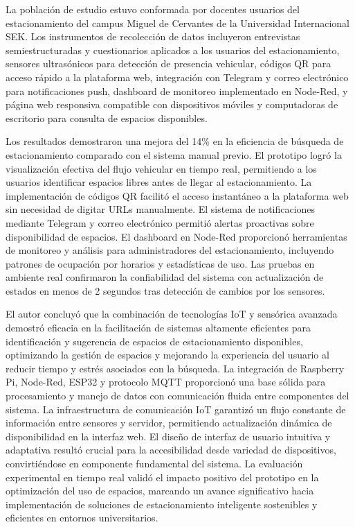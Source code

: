\documentclass[12pt,a4paper]{article}
\begin{document}
La población de estudio estuvo conformada por docentes usuarios del estacionamiento del campus Miguel de Cervantes de la Universidad Internacional SEK. Los instrumentos de recolección de datos incluyeron entrevistas semiestructuradas y cuestionarios aplicados a los usuarios del estacionamiento, sensores ultrasónicos para detección de presencia vehicular, códigos QR para acceso rápido a la plataforma web, integración con Telegram y correo electrónico para notificaciones push, dashboard de monitoreo implementado en Node-Red, y página web responsiva compatible con dispositivos móviles y computadoras de escritorio para consulta de espacios disponibles.

Los resultados demostraron una mejora del 14\% en la eficiencia de búsqueda de estacionamiento comparado con el sistema manual previo. El prototipo logró la visualización efectiva del flujo vehicular en tiempo real, permitiendo a los usuarios identificar espacios libres antes de llegar al estacionamiento. La implementación de códigos QR facilitó el acceso instantáneo a la plataforma web sin necesidad de digitar URLs manualmente. El sistema de notificaciones mediante Telegram y correo electrónico permitió alertas proactivas sobre disponibilidad de espacios. El dashboard en Node-Red proporcionó herramientas de monitoreo y análisis para administradores del estacionamiento, incluyendo patrones de ocupación por horarios y estadísticas de uso. Las pruebas en ambiente real confirmaron la confiabilidad del sistema con actualización de estados en menos de 2 segundos tras detección de cambios por los sensores.

El autor concluyó que la combinación de tecnologías IoT y sensórica avanzada demostró eficacia en la facilitación de sistemas altamente eficientes para identificación y sugerencia de espacios de estacionamiento disponibles, optimizando la gestión de espacios y mejorando la experiencia del usuario al reducir tiempo y estrés asociados con la búsqueda. La integración de Raspberry Pi, Node-Red, ESP32 y protocolo MQTT proporcionó una base sólida para procesamiento y manejo de datos con comunicación fluida entre componentes del sistema. La infraestructura de comunicación IoT garantizó un flujo constante de información entre sensores y servidor, permitiendo actualización dinámica de disponibilidad en la interfaz web. El diseño de interfaz de usuario intuitiva y adaptativa resultó crucial para la accesibilidad desde variedad de dispositivos, convirtiéndose en componente fundamental del sistema. La evaluación experimental en tiempo real validó el impacto positivo del prototipo en la optimización del uso de espacios, marcando un avance significativo hacia implementación de soluciones de estacionamiento inteligente sostenibles y eficientes en entornos universitarios.
\end{document}
